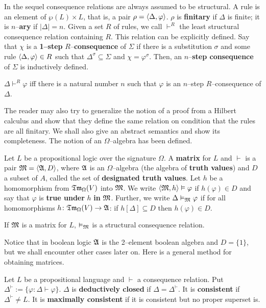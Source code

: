 In the sequel consequence relations are always assumed to be
structural. A rule is an element of $\wp(L) \times L$,
that is, a pair $\rho = \langle \Delta, \varphi\rangle$. $\rho$ is 
\textbf{finitary} if $\Delta$ is finite; it is $n$--\textbf{ary} 
if $|\Delta| = n$. Given a set $R$ of rules, we call $\vdash^R$ the 
least structural consequence relation containing $R$. This relation
can be explicitly defined. Say that $\chi$ is a \textbf{1--step}
$R$--\textbf{consequence} of $\Sigma$ if there is a substitution
$\sigma$ and some rule $\langle \Delta, \varphi\rangle \in R$ such that
$\Delta^{\sigma} \subseteq \Sigma$ and $\chi = \varphi^{\sigma}$.
Then, an $n$--\textbf{step consequence} of $\Sigma$ is inductively
defined.
\begin{prop}
$\Delta \vdash^R \varphi$ iff there is a natural
number $n$ such that $\varphi$ is an $n$--step $R$--consequence
of $\Delta$.
\end{prop}
The reader may also try to generalize the notion of a proof from
a Hilbert calculus and show that they define the same relation
on condition that the rules are all finitary. We shall also give
an abstract semantics and show its completeness. The notion of an
$\Omega$--algebra has been defined.
\begin{defn}
Let $L$ be a propositional logic over the signature $\Omega$. A
\textbf{matrix} for $L$ and $\vdash$ is a pair $\mathfrak{M} = \langle \mathfrak{A}, D\rangle$,
where $\mathfrak{A}$ is an $\Omega$--algebra (the algebra of \textbf{truth values})
and $D$ a subset of $A$, called the set of \textbf{designated
truth values}. Let $h$ be a homomorphism from $\mathfrak{Tm}_{\Omega}(V)$
into $\mathfrak{M}$. We write $\langle \mathfrak{M}, h\rangle \vDash \varphi$ if
$h(\varphi) \in D$ and say that $\varphi$ is \textbf{true under}
$h$ \textbf{in} $\mathfrak{M}$. Further, we write $\Delta \vDash_{\mathfrak{M}} \varphi$
if for all homomorphisms $h \colon \mathfrak{Tm}_{\Omega}(V) \rightarrow \mathfrak{A}$: if
$h[\Delta] \subseteq D$ then $h(\varphi) \in D$.
\end{defn}
\begin{prop}
If $\mathfrak{M}$ is a matrix for $L$, $\vDash_{\mathfrak{M}}$ is a structural
consequence relation.
\end{prop}
Notice that in boolean logic $\mathfrak{A}$ is the 2--element boolean
algebra and $D = \{1\}$, but we shall encounter other cases
later on. Here is a general method for obtaining matrices.
\begin{defn}
Let $L$ be a propositional language and $\vdash$ a consequence
relation. Put $\Delta^{\vdash} := \{\varphi : \Delta \vdash 
\varphi\}$. $\Delta$ is \textbf{deductively closed} if $\Delta 
= \Delta^{\vdash}$. It is \textbf{consistent} if $\Delta^{\vdash} 
\neq L$. It is \textbf{maximally consistent} if
it is consistent but no proper superset is.
\end{defn}
